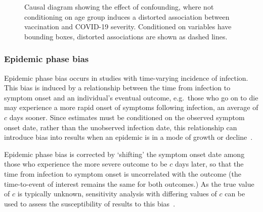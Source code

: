 \begin{figure}[htbp!]
    \centering
    \caption[Causal diagram showing the effect of confounding]{Causal diagram showing the effect of confounding, where not conditioning on age group induces a distorted association between vaccination and COVID-19 severity. Conditioned on variables have bounding boxes, distorted associations are shown as dashed lines.}\label{fig:confounding}
\end{figure}

\subsubsection{Epidemic phase bias}

Epidemic phase bias occurs in studies with time-varying incidence of infection. This bias is induced by a relationship between the time from infection to symptom onset and an individual's eventual outcome, e.g.\ those who go on to die may experience a more rapid onset of symptoms following infection, an average of $c$ days sooner. Since estimates must be conditioned on the observed symptom onset date, rather than the unobserved infection date, this relationship can introduce bias into results when an epidemic is in a mode of growth or decline~\parencite{Seaman2022-tl}.

Epidemic phase bias is corrected by `shifting' the symptom onset date among those who experience the more severe outcome to be $c$ days later, so that the time from infection to symptom onset is uncorrelated with the outcome (the time-to-event of interest remains the same for both outcomes.) As the true value of $c$ is typically unknown, sensitivity analysis with differing values of $c$ can be used to assess the susceptibility of results to this bias~\parencite{Seaman2022-tl}.